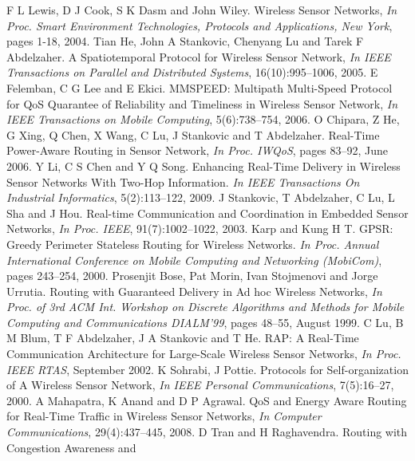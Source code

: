 \documentclass[fleqn,twoside]{article}
\begin{document}
\begin{thebibliography}{36}





F L Lewis, D J Cook, S K Dasm and John Wiley. {Wireless Sensor
  Networks}, \emph{In Proc. Smart Environment Technologies, Protocols and
  Applications, New York}, pages 1-18, 2004.
Tian He, John A Stankovic, Chenyang Lu and Tarek F Abdelzaher. {A
  Spatiotemporal Protocol for Wireless Sensor Network}, \emph{In IEEE
  Transactions on Parallel and Distributed Systems}, 16(10):995--1006, 2005.
E Felemban, C G Lee and E Ekici. {MMSPEED: Multipath Multi-Speed
  Protocol for QoS Quarantee of Reliability and Timeliness in Wireless Sensor
  Network}, \emph{In IEEE Transactions on Mobile Computing}, 5(6):738--754, 2006.
O Chipara, Z He, G Xing, Q Chen, X Wang, C Lu, J Stankovic and T
  Abdelzaher. {Real-Time Power-Aware Routing in Sensor Network}, 
  \emph{In Proc. IWQoS}, pages 83--92, June 2006.
Y Li, C S Chen and Y Q Song. {Enhancing Real-Time Delivery in Wireless
  Sensor Networks With Two-Hop Information}. \emph{In IEEE Transactions On
  Industrial Informatics}, 5(2):113--122, 2009.
J Stankovic, T Abdelzaher, C Lu, L Sha and J Hou. {Real-time
  Communication and Coordination in Embedded Sensor Networks}, \emph{In Proc.
  IEEE}, 91(7):1002--1022, 2003.
Karp and Kung H T. {GPSR: Greedy Perimeter Stateless Routing for
  Wireless Networks}. \emph{In Proc.  Annual International Conference on
  Mobile Computing and Networking (MobiCom)}, pages 243--254, 2000.
Prosenjit Bose, Pat Morin, Ivan Stojmenovi and Jorge Urrutia. {Routing
  with Guaranteed Delivery in Ad hoc Wireless Networks}, \emph{In Proc. of
  3rd ACM Int. Workshop on Discrete Algorithms and Methods for Mobile Computing
  and Communications DIALM'99}, pages 48--55, August 1999.
C Lu, B M Blum, T F Abdelzaher, J A Stankovic and T He. {RAP: A
  Real-Time Communication Architecture for Large-Scale Wireless Sensor
  Networks}, \emph{In Proc. IEEE RTAS}, September 2002.
K Sohrabi, J Pottie. {Protocols for Self-organization of A Wireless
  Sensor Network}, \emph{In IEEE Personal Communications}, 7(5):16--27, 2000.
A Mahapatra, K Anand and D P Agrawal. {QoS and Energy Aware Routing for
  Real-Time Traffic in Wireless Sensor Networks}, \emph{In Computer
  Communications}, 29(4):437--445, 2008.
D Tran and H Raghavendra. {Routing with Congestion Awareness and
}
\end{thebibliography}
\end{document}
